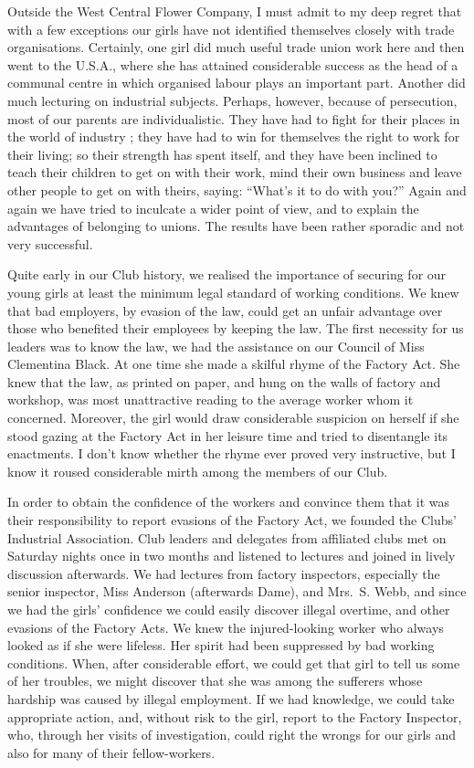 Outside the West Central Flower Company, I must
admit to my deep regret that with a few exceptions our
girls have not identified themselves closely with trade
organisations. Certainly, one girl did much useful trade
union work here and then went to the U.S.A., where she
has attained considerable success as the head of a
communal centre in which organised labour plays an
important part. Another did much lecturing on industrial
subjects. Perhaps, however, because of persecution, most
of our parents are individualistic. They have had to
fight for their places in the world of industry ; they have
had to win for themselves the right to work for their
living; so their strength has spent itself, and they have been
inclined to teach their children to get on with their work,
mind their own business and leave other people to get on
with theirs, saying: “What’s it to do with you?” Again
and again we have tried to inculcate a wider point of
view, and to explain the advantages of belonging to
unions. The results have been rather sporadic and not
very successful.

Quite early in our Club history, we realised the
importance of securing for our young girls at least the
minimum legal standard of working conditions. We knew that
bad employers, by evasion of the law, could get an unfair
advantage over those who benefited their employees by
keeping the law. The first necessity for us leaders was to
know the law, we had the assistance on our Council of
Miss Clementina Black. At one time she made a skilful
rhyme of the Factory Act. She knew that the law, as
printed on paper, and hung on the walls of factory and
workshop, was most unattractive reading to the average
worker whom it concerned. Moreover, the girl would
draw considerable suspicion on herself if she stood gazing
at the Factory Act in her leisure time and tried to
disentangle its enactments. I don’t know whether the rhyme
ever proved very instructive, but I know it roused
considerable mirth among the members of our Club.

In order to obtain the confidence of the workers and
convince them that it was their responsibility to report
evasions of the Factory Act, we founded the Clubs’
Industrial Association. Club leaders and delegates from
affiliated clubs met on Saturday nights once in two
months and listened to lectures and joined in lively
discussion afterwards. We had lectures from factory
inspectors, especially the senior inspector, Miss Anderson
(afterwards Dame), and Mrs.\ S. Webb, and since we had
the girls’ confidence we could easily discover illegal
overtime, and other evasions of the Factory Acts. We knew
the injured-looking worker who always looked as if she
were lifeless. Her spirit had been suppressed by bad working
conditions. When, after considerable effort, we could
get that girl to tell us some of her troubles, we might
discover that she was among the sufferers whose hardship
was caused by illegal employment. If we had knowledge,
we could take appropriate action, and, without risk to the
girl, report to the Factory Inspector, who, through her
visits of investigation, could right the wrongs for our girls
and also for many of their fellow-workers.

